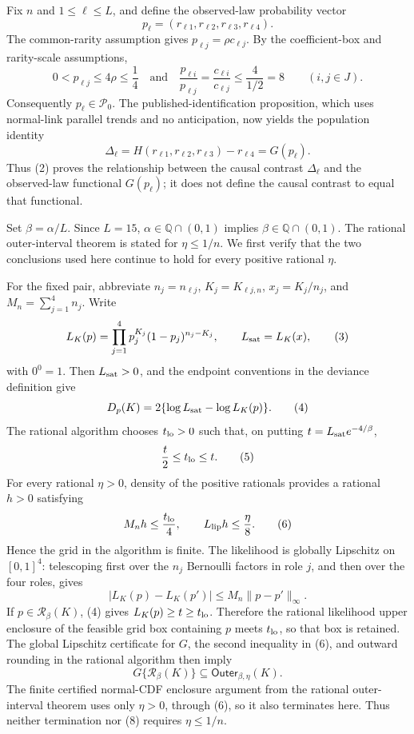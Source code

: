 Fix \(n\) and \(1\leq \ell\leq L\), and define the observed-law probability vector
\[
p_\ell=(r_{\ell1},r_{\ell2},r_{\ell3},r_{\ell4}).
\]
The common-rarity assumption gives \(p_{\ell j}=\rho c_{\ell j}\).  By the coefficient-box and rarity-scale assumptions,
\[
0<p_{\ell j}\leq4\rho\leq\frac14
\quad\text{and}\quad
\frac{p_{\ell i}}{p_{\ell j}}
=\frac{c_{\ell i}}{c_{\ell j}}
\leq\frac4{1/2}=8
\qquad(i,j\in J).
\tag{1}
\]
Consequently \(p_\ell\in\mathcal P_0\).  The published-identification proposition, which uses normal-link parallel trends and no anticipation, now yields the population identity
\[
\Delta_\ell
=H(r_{\ell1},r_{\ell2},r_{\ell3})-r_{\ell4}
=G(p_\ell).
\tag{2}
\]
Thus (2) proves the relationship between the causal contrast \(\Delta_\ell\) and the observed-law functional \(G(p_\ell)\); it does not define the causal contrast to equal that functional.

Set \(\beta=\alpha/L\).  Since \(L=15\), \(\alpha\in\mathbb Q\cap(0,1)\) implies \(\beta\in\mathbb Q\cap(0,1)\).  The rational outer-interval theorem is stated for \(\eta\leq1/n\).  We first verify that the two conclusions used here continue to hold for every positive rational \(\eta\).

For the fixed pair, abbreviate \(n_j=n_{\ell j}\), \(K_j=K_{\ell j,n}\), \(x_j=K_j/n_j\), and \(M_n=\sum_{j=1}^4n_j\).  Write
\[
L_K(p)=\prod_{j=1}^4p_j^{K_j}(1-p_j)^{n_j-K_j},
\qquad
L_{\rm sat}=L_K(x),
\tag{3}
\]
with \(0^0=1\).  Then \(L_{\rm sat}>0\), and the endpoint conventions in the deviance definition give
\[
D_p(K)=2\{\log L_{\rm sat}-\log L_K(p)\}.
\tag{4}
\]
The rational algorithm chooses \(t_{\rm lo}>0\) such that, on putting \(t=L_{\rm sat}e^{-4/\beta}\),
\[
\frac t2\leq t_{\rm lo}\leq t.
\tag{5}
\]
For every rational \(\eta>0\), density of the positive rationals provides a rational \(h>0\) satisfying
\[
M_nh\leq\frac{t_{\rm lo}}4,
\qquad
L_{\rm lip}h\leq\frac\eta8.
\tag{6}
\]
Hence the grid in the algorithm is finite.  The likelihood is globally Lipschitz on \([0,1]^4\): telescoping first over the \(n_j\) Bernoulli factors in role \(j\), and then over the four roles, gives
\[
|L_K(p)-L_K(p')|
\leq M_n\lVert p-p'\rVert_\infty.
\tag{7}
\]
If \(p\in\mathcal R_\beta(K)\), (4) gives \(L_K(p)\geq t\geq t_{\rm lo}\).  Therefore the rational likelihood upper enclosure of the feasible grid box containing \(p\) meets \(t_{\rm lo}\), so that box is retained.  The global Lipschitz certificate for \(G\), the second inequality in (6), and outward rounding in the rational algorithm then imply
\[
G\{\mathcal R_\beta(K)\}
\subseteq \mathsf{Outer}_{\beta,\eta}(K).
\tag{8}
\]
The finite certified normal-CDF enclosure argument from the rational outer-interval theorem uses only \(\eta>0\), through (6), so it also terminates here.  Thus neither termination nor (8) requires \(\eta\leq1/n\).

